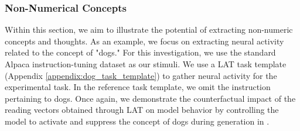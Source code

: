 \subsubsection{Non-Numerical Concepts}
Within this section, we aim to illustrate the potential of extracting non-numeric concepts and thoughts. As an example, we focus on extracting neural activity related to the concept of "dogs." For this investigation, we use the standard Alpaca instruction-tuning dataset as our stimuli. We use a LAT task template (Appendix \ref{appendix:dog_task_template}) to gather neural activity for the experimental task. In the reference task template, we omit the instruction pertaining to dogs. Once again, we demonstrate the counterfactual impact of the reading vectors obtained through LAT on model behavior by controlling the model to activate and suppress the concept of dogs during generation in .
